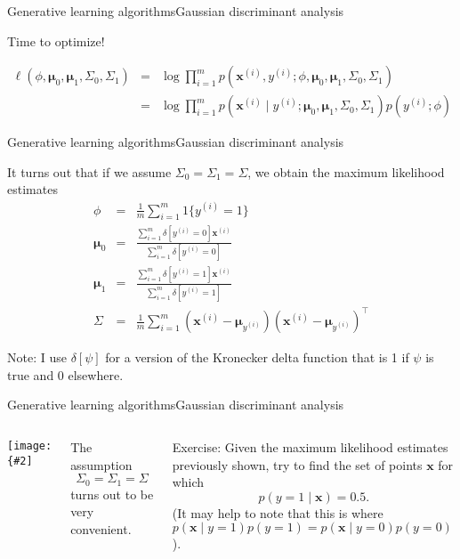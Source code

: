 \documentclass{beamer}
\renewcommand{\vec}[1]{\boldsymbol{#1}}
\newcommand{\myfig}[3]{\centerline{\texttt{[image: \{\#2]}}}
    \centerline{\scriptsize #3}}
\begin{document}
\begin{frame}{Generative learning algorithms}{Gaussian discriminant analysis}

  Time to optimize!

  \begin{eqnarray}
    \ell(\phi,\vec{\mu}_0,\vec{\mu}_1,\Sigma_0,\Sigma_1) & = &
    \log \prod_{i=1}^m p(\vec{x}^{(i)},y^{(i)};\phi,\vec{\mu}_0,\vec{\mu}_1,
    \Sigma_0,\Sigma_1) \nonumber \\
    & = & \log \prod_{i=1}^m p(\vec{x}^{(i)} \mid y^{(i)};\vec{\mu}_0,\vec{\mu}_1,
    \Sigma_0,\Sigma_1) p(y^{(i)} ; \phi)\nonumber
  \end{eqnarray}

\end{frame}


\begin{frame}{Generative learning algorithms}{Gaussian discriminant analysis}

  It turns out that if we assume $\Sigma_0 = \Sigma_1 = \Sigma$, we obtain
  the maximum likelihood estimates
  \begin{eqnarray}
    \phi & = & \frac{1}{m}\sum_{i=1}^m1\{y^{(i)}=1\} \nonumber \\
    \vec{\mu}_0 & = & \frac{\sum_{i=1}^m\delta[y^{(i)}=0]\vec{x}^{(i)}}{\sum_{i=1}^m\delta[y^{(i)}=0]} \nonumber \\
    \vec{\mu}_1 & = & \frac{\sum_{i=1}^m\delta[y^{(i)}=1]\vec{x}^{(i)}}{\sum_{i=1}^m\delta[y^{(i)}=1]} \nonumber \\
    \Sigma & = & \frac{1}{m} \sum_{i=1}^m(\vec{x}^{(i)}-\vec{\mu}_{y^{(i)}})(\vec{x}^{(i)}-\vec{\mu}_{y^{(i)}})^\top
  \end{eqnarray}

  Note: I use $\delta[\psi]$ for a version of the \alert{Kronecker
    delta} function that is 1 if $\psi$ is true and 0 elsewhere.
  
\end{frame}


\begin{frame}{Generative learning algorithms}{Gaussian discriminant analysis}

  \begin{columns}

    \column{2.5in}
    
    \myfig{2.4in}{gda}{Ng, CS229 lecture note set \#2}
    
    \column{2.0in}
    
    The assumption
    \[ \Sigma_0 = \Sigma_1 = \Sigma \]
    turns out to be very convenient.

    \medskip
    
    \alert{Exercise:} Given the maximum likelihood estimates
    previously shown, try to find the set of points $\vec{x}$ for
    which
    \[ p(y=1 \mid \vec{x}) = 0.5. \]
    (It may help to note that this is where $p(\vec{x} \mid y=1 )p(y=1) =
    p(\vec{x}\mid y=0)p(y=0)$).

  \end{columns}
  
\end{frame}
\end{document}
